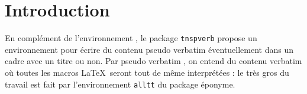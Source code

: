 \documentclass[12pt,a4paper]{article}
\begin{document}
\section{Introduction}

En complément de l'environnement , le package \verb#tnspverb# propose   un environnement pour écrire du contenu \og pseudo verbatim \fg{} éventuellement dans un cadre avec un titre ou non.
Par \og pseudo verbatim \fg{}, on entend du contenu verbatim où toutes les macros \LaTeX\ seront tout de même interprétées : le très gros du travail est fait par l'environnement \verb#alltt# du package éponyme.

\end{document}
